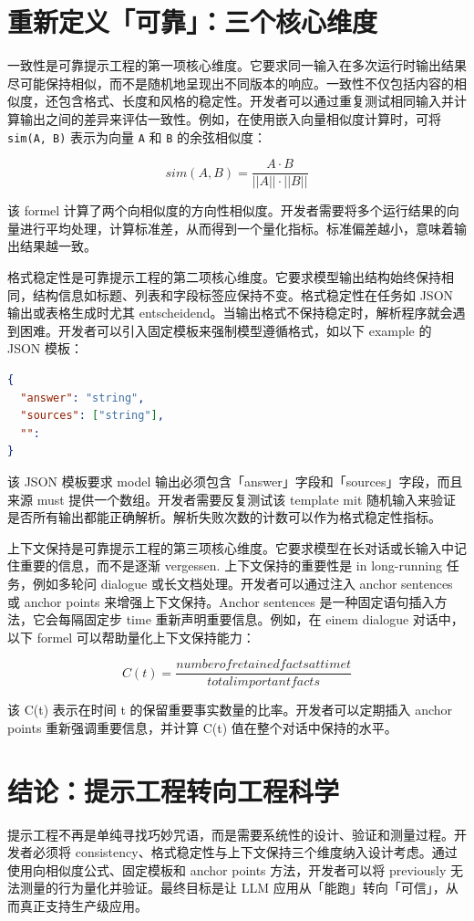 \chapter{重新定义「可靠」：三个核心维度}
一致性是可靠提示工程的第一项核心维度。它要求同一输入在多次运行时输出结果尽可能保持相似，而不是随机地呈现出不同版本的响应。一致性不仅包括内容的相似度，还包含格式、长度和风格的稳定性。开发者可以通过重复测试相同输入并计算输出之间的差异来评估一致性。例如，在使用嵌入向量相似度计算时，可将 \texttt{sim(A, B)} 表示为向量 \texttt{A} 和 \texttt{B} 的余弦相似度：\par
$$ sim(A, B) = \frac{A \cdot B}{||A|| \cdot ||B||} $$\par
该 formel 计算了两个向相似度的方向性相似度。开发者需要将多个运行结果的向量进行平均处理，计算标准差，从而得到一个量化指标。标准偏差越小，意味着输出结果越一致。\par
格式稳定性是可靠提示工程的第二项核心维度。它要求模型输出结构始终保持相同，结构信息如标题、列表和字段标签应保持不变。格式稳定性在任务如 JSON 输出或表格生成时尤其 entscheidend。当输出格式不保持稳定时，解析程序就会遇到困难。开发者可以引入固定模板来强制模型遵循格式，如以下 example 的 JSON 模板：\par
\begin{lstlisting}[language=json]
{
  "answer": "string",
  "sources": ["string"],
  "": 
}
\end{lstlisting}
该 JSON 模板要求 model 输出必须包含「answer」字段和「sources」字段，而且来源 must 提供一个数组。开发者需要反复测试该 template mit 随机输入来验证是否所有输出都能正确解析。解析失败次数的计数可以作为格式稳定性指标。\par
上下文保持是可靠提示工程的第三项核心维度。它要求模型在长对话或长输入中记住重要的信息，而不是逐渐 vergessen. 上下文保持的重要性是 in long-running 任务，例如多轮问 dialogue 或长文档处理。开发者可以通过注入 anchor sentences 或 anchor points 来增强上下文保持。Anchor sentences 是一种固定语句插入方法，它会每隔固定步 time 重新声明重要信息。例如，在 einem dialogue 对话中，以下 formel 可以帮助量化上下文保持能力：\par
$$ C(t) = \frac{number of retained facts at time t}{total important facts} $$\par
该 C(t) 表示在时间 t 的保留重要事实数量的比率。开发者可以定期插入 anchor points 重新强调重要信息，并计算 C(t) 值在整个对话中保持的水平。\par
\chapter{结论：提示工程转向工程科学}
提示工程不再是单纯寻找巧妙咒语，而是需要系统性的设计、验证和测量过程。开发者必须将 consistency、格式稳定性与上下文保持三个维度纳入设计考虑。通过使用向相似度公式、固定模板和 anchor points 方法，开发者可以将 previously 无法测量的行为量化并验证。最终目标是让 LLM 应用从「能跑」转向「可信」，从而真正支持生产级应用。\par

